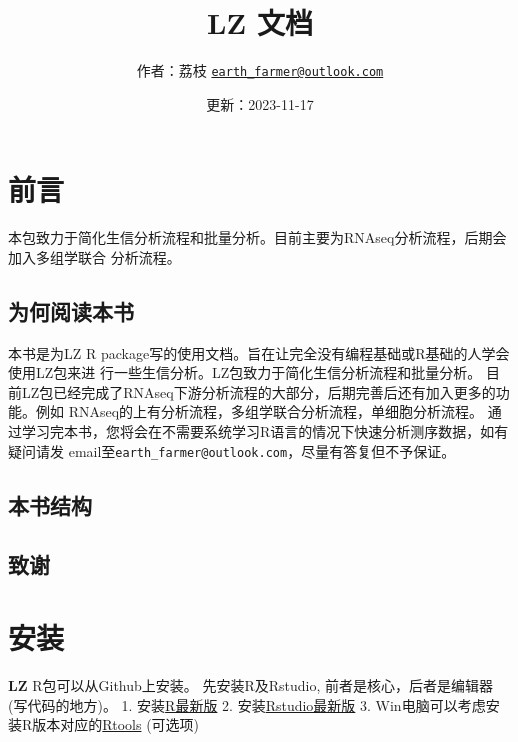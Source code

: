\documentclass[
]{book}
\title{LZ 文档}
\author{作者：荔枝 \href{mailto:earth_farmer@outlook.com}{\nolinkurl{earth\_farmer@outlook.com}}}
\date{更新：2023-11-17}
\begin{document}
\maketitle

{
\setcounter{tocdepth}{1}
\tableofcontents
}
\hypertarget{ux524dux8a00}{%
\chapter*{前言}\label{ux524dux8a00}}

本包致力于简化生信分析流程和批量分析。目前主要为RNAseq分析流程，后期会加入多组学联合
分析流程。

\hypertarget{ux4e3aux4f55ux9605ux8bfbux672cux4e66}{%
\section*{为何阅读本书}\label{ux4e3aux4f55ux9605ux8bfbux672cux4e66}}

本书是为LZ R package写的使用文档。旨在让完全没有编程基础或R基础的人学会使用LZ包来进
行一些生信分析。LZ包致力于简化生信分析流程和批量分析。
目前LZ包已经完成了RNAseq下游分析流程的大部分，后期完善后还有加入更多的功能。例如
RNAseq的上有分析流程，多组学联合分析流程，单细胞分析流程。
通过学习完本书，您将会在不需要系统学习R语言的情况下快速分析测序数据，如有疑问请发
email至\texttt{earth\_farmer@outlook.com}，尽量有答复但不予保证。

\hypertarget{ux672cux4e66ux7ed3ux6784}{%
\section*{本书结构}\label{ux672cux4e66ux7ed3ux6784}}

\hypertarget{ux81f4ux8c22}{%
\section*{致谢}\label{ux81f4ux8c22}}

\hypertarget{install}{%
\chapter{安装}\label{install}}

\textbf{LZ} R包可以从Github上安装。
先安装R及Rstudio, 前者是核心，后者是编辑器(写代码的地方)。
1. 安装\href{https://www.r-project.org/}{R最新版}
2. 安装\href{https://posit.co/download/rstudio-desktop/}{Rstudio最新版}
3. Win电脑可以考虑安装R版本对应的\href{https://cran.r-project.org/bin/windows/Rtools/}{Rtools} (可选项)
\end{document}

